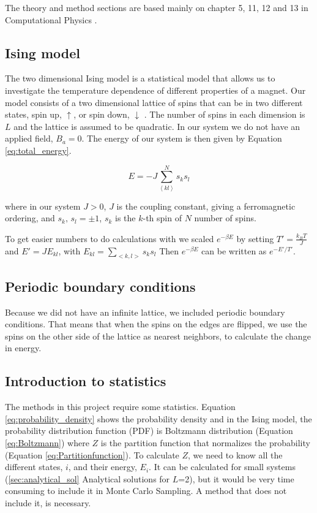 The theory and method sections are based mainly on chapter 5, 11, 12 and 13 in Computational Physics \cite{Jensen}.

\subsection{Ising model}

The two dimensional Ising model is a statistical model that allows us to investigate the temperature dependence of different properties of a magnet. Our model consists of a two dimensional lattice of spins that can be in two different states, spin up, $\uparrow$, or spin down, $\downarrow$ \cite{Ising}. The number of spins in each dimension is $L$ and the lattice is assumed to be quadratic. In our system we do not have an applied field, $B_a = 0$. The energy of our system is then given by Equation \ref{eq:total_energy}.

\begin{equation}\label{eq:total_energy}
E = - J \sum^N_{\left< kl \right>} s_k s_l
\end{equation}

where in our system $J > 0$, $J$ is the coupling constant, giving a ferromagnetic ordering, and $s_k, \, s_l = \pm 1$, $s_k$ is the $k$-th spin of $N$ number of spins.

To get easier numbers to do calculations with we scaled $ e^{-\beta E} $ by setting $ T' = \frac{k_B T	}{J} $ and $ E' = JE_{kl} $, with $ E_{kl} = \sum\limits_{<k,l>} s_ks_l $ Then $e^{-\beta E} $ can be written as $ e^{-E'/T'} $.

\subsection{Periodic boundary conditions}

Because we did not have an infinite lattice, we included periodic boundary conditions. That means that when the spins on the edges are flipped, we use the spins on the other side of the lattice as nearest neighbors, to calculate the change in energy.

\subsection{Introduction to statistics}

The methods in this project require some statistics. Equation \ref{eq:probability_density} shows the probability density and in the Ising model, the probability distribution function (PDF) is Boltzmann distribution (Equation \ref{eq:Boltzmann}) where $Z$ is the partition function that normalizes the probability (Equation \ref{eq:Partitionfunction}). To calculate $Z$, we need to know all the different states, $i$, and their energy, $E_i$. It can be calculated for small systems (\ref{sec:analytical_sol} Analytical solutions for $L$=2), but it would be very time consuming to include it in Monte Carlo Sampling. A method that does not include it, is necessary.

